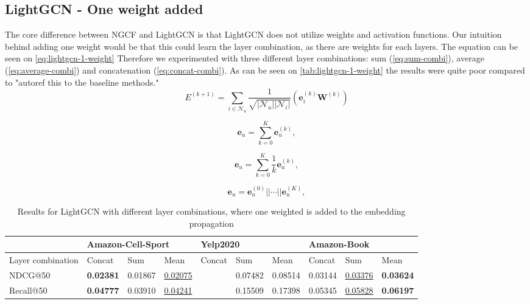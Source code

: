 \subsection{LightGCN - One weight added}
The core difference between NGCF and LightGCN is that LightGCN does not utilize weights and activation functions.
Our intuition behind adding one weight would be that this could learn the layer combination, as there are weights for each layers.
The equation can be seen on \autoref{eq:lightgcn-1-weight}
Therefore we experimented with three different layer combinations: sum (\autoref{eq:sum-combi}), average (\autoref{eq:average-combi}) and concatenation (\autoref{eq:concat-combi}).
As can be seen on \autoref{tab:lightgcn-1-weight} the results were quite poor compared to "autoref this to the baseline methods."
\begin{equation}
    E^{(k+1)} = \sum_{i \in \mathcal{N}_u} \frac{1}{\sqrt{|\mathcal{N}_u||\mathcal{N}_i|}}\left( \mathbf{e}_i^{(k)} \mathbf{W}^{(k)} \right)
    \label{eq:lightgcn-1-weight}
\end{equation}

\begin{equation}
    \mathbf{e}_u = \sum_{k=0}^{K} \mathbf{e}_u^{(k)},
    \label{eq:sum-combi}
\end{equation}

\begin{equation}
    \mathbf{e}_u = \sum_{k=0}^{K} \frac{1}{k} \mathbf{e}_u^{(k)},
    \label{eq:average-combi}
\end{equation}

\begin{equation}
    \mathbf{e}_u = \mathbf{e}_u^{(0)}|| \cdots || \mathbf{e}_u^{(K)},
    \label{eq:concat-combi}
\end{equation}

\begin{table*}[]
    \begin{tabular}{|l|l|l|l|l|l|l|l|l|l|}
        \hline
                          & \multicolumn{3}{l|}{Amazon-Cell-Sport} & \multicolumn{3}{l|}{Yelp2020} & \multicolumn{3}{l|}{Amazon-Book}                                                                          \\ \hline
        Layer combination & Concat                                 & Sum                           & Mean                             & Concat & Sum        & Mean        & Concat  & Sum                 & Mean             \\ \hline
        NDCG@50           & \textbf{0.02381}                       & 0.01867                       & \underline{0.02075}              &        & 0.07482    & 0.08514     & 0.03144 & \underline{0.03376} & \textbf{0.03624} \\ \hline
        Recall@50         & \textbf{0.04777}                       & 0.03910                       & \underline{0.04241}              &        & 0.15509    & 0.17398     & 0.05345 & \underline{0.05828} & \textbf{0.06197} \\ \hline
    \end{tabular}
    \caption{Results for LightGCN with different layer combinations, where one weighted is added to the embedding propagation}
    \label{tab:lightgcn-1-weight}
\end{table*}